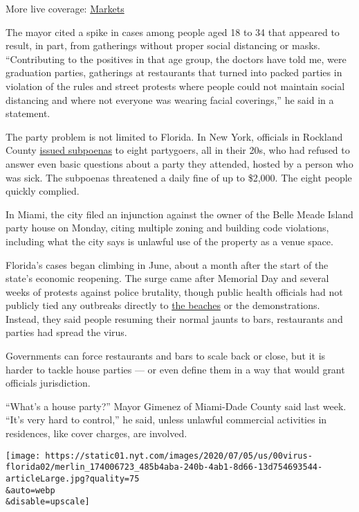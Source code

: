 More live coverage:
\href{https://www.nytimes.com/live/2020/07/31/business/stock-market-today-coronavirus?action=click\&pgtype=Article\&state=default\&region=MAIN_CONTENT_1\&context=storylines_live_updates}{Markets}

The mayor cited a spike in cases among people aged 18 to 34 that
appeared to result, in part, from gatherings without proper social
distancing or masks. ``Contributing to the positives in that age group,
the doctors have told me, were graduation parties, gatherings at
restaurants that turned into packed parties in violation of the rules
and street protests where people could not maintain social distancing
and where not everyone was wearing facial coverings,'' he said in a
statement.

The party problem is not limited to Florida. In New York, officials in
Rockland County
\href{https://www.nytimes.com/2020/07/01/nyregion/rockland-coronavirus-party.html}{issued
subpoenas} to eight partygoers, all in their 20s, who had refused to
answer even basic questions about a party they attended, hosted by a
person who was sick. The subpoenas threatened a daily fine of up to
\$2,000. The eight people quickly complied.

In Miami, the city filed an injunction against the owner of the Belle
Meade Island party house on Monday, citing multiple zoning and building
code violations, including what the city says is unlawful use of the
property as a venue space.

Florida's cases began climbing in June, about a month after the start of
the state's economic reopening. The surge came after Memorial Day and
several weeks of protests against police brutality, though public health
officials had not publicly tied any outbreaks directly to
\href{https://www.nytimes.com/2020/04/30/us/newsom-beaches-california-coronavirus.html}{the
beaches} or the demonstrations. Instead, they said people resuming their
normal jaunts to bars, restaurants and parties had spread the virus.

Governments can force restaurants and bars to scale back or close, but
it is harder to tackle house parties --- or even define them in a way
that would grant officials jurisdiction.

``What's a house party?'' Mayor Gimenez of Miami-Dade County said last
week. ``It's very hard to control,'' he said, unless unlawful commercial
activities in residences, like cover charges, are involved.

\texttt{[image: https://static01.nyt.com/images/2020/07/05/us/00virus-florida02/merlin\_174006723\_485b4aba-240b-4ab1-8d66-13d754693544-articleLarge.jpg?quality=75\\\&auto=webp\\\&disable=upscale]}

